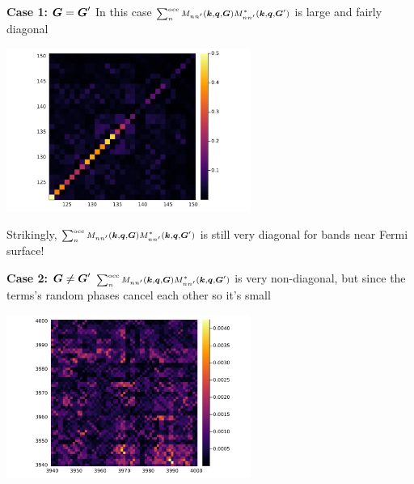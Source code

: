 \documentclass[t]{beamer}
\begin{document}
\begin{frame}[allowframebreaks]
\framebreak

\textbf{Case 1: $\vb*{G} = \vb*{G}'$}  In this case $\scriptstyle \sum_{n}^{\text{occ}} M_{n n'} (\vb*{k}, \vb*{q}, \vb*{G}) M^*_{nn'} (\vb*{k}, \vb*{q}, \vb*{G}')$ is large and fairly diagonal

\begin{center}
    \includegraphics[width=0.6\textwidth]{../data/chi/nc_range-121-150-k_idx-2-q_idx-3-G_idx-100.png}
\end{center}

Strikingly, $\scriptstyle \sum_{n}^{\text{occ}} M_{n n'} (\vb*{k}, \vb*{q}, \vb*{G}) M^*_{nn'} (\vb*{k}, \vb*{q}, \vb*{G}')$ is still very diagonal for bands near Fermi surface!

\framebreak

\textbf{Case 2: $\vb*{G} \neq \vb*{G}'$} $\scriptstyle \sum_{n}^{\text{occ}} M_{n n'} (\vb*{k}, \vb*{q}, \vb*{G}) M^*_{nn'} (\vb*{k}, \vb*{q}, \vb*{G}')$ is very non-diagonal, 
but since the terms's random phases cancel each other so it's small

\begin{center}
    \includegraphics[width=0.6\textwidth]{../data/chi/nc_range-3939-4000-k_idx-2-q_idx-3-G1_idx-2000-G2_idx-2001.png}
\end{center}

\end{frame}
\end{document}
